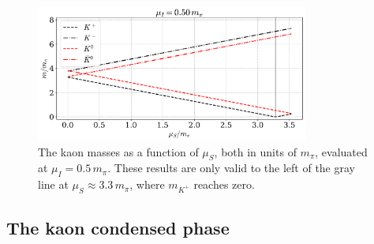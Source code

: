 \begin{figure}
    \centering
    \includegraphics[width=0.8\textwidth]{../scripts/figurer/masses_kaons2.pdf}
    \caption{
        The kaon masses as a function of $\mu_S$, both in units of $m_\pi$, evaluated at $\mu_I = 0.5 \, m_\pi$.
        These results are only valid to the left of the gray line at $\mu_S\approx 3.3 \, m_\pi$, where $m_{K^+}$ reaches zero.
    }
    \label{fig: leading order masses kaos afo strangeness}
\end{figure}





\subsection{The kaon condensed phase}

